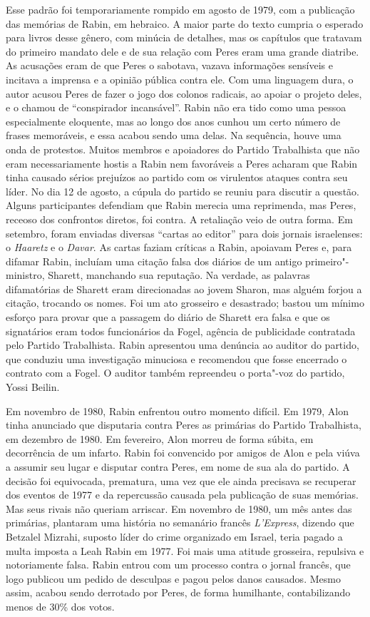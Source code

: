 Esse padrão foi temporariamente rompido em agosto de 1979, com a
publicação das memórias de Rabin, em hebraico. A maior parte do texto
cumpria o esperado para livros desse gênero, com minúcia de detalhes,
mas os capítulos que tratavam do primeiro mandato dele e de sua relação
com Peres eram uma grande diatribe. As acusações eram de que Peres o
sabotava, vazava informações sensíveis e incitava a imprensa e a opinião
pública contra ele. Com uma linguagem dura, o autor acusou Peres de
fazer o jogo dos colonos radicais, ao apoiar o projeto deles, e o chamou
de ``conspirador incansável''. Rabin não era tido como uma pessoa
especialmente eloquente, mas ao longo dos anos cunhou um certo número de
frases memoráveis, e essa acabou sendo uma delas. Na sequência, houve
uma onda de protestos. Muitos membros e apoiadores do Partido
Trabalhista que não eram necessariamente hostis a Rabin nem favoráveis a
Peres acharam que Rabin tinha causado sérios prejuízos ao partido com os
virulentos ataques contra seu líder. No dia 12 de agosto, a cúpula do
partido se reuniu para discutir a questão. Alguns participantes
defendiam que Rabin merecia uma reprimenda, mas Peres, receoso dos
confrontos diretos, foi contra. A retaliação veio de outra forma. Em
setembro, foram enviadas diversas ``cartas ao editor'' para dois jornais
israelenses: o \emph{Haaretz} e o \emph{Davar}. As cartas faziam
críticas a Rabin, apoiavam Peres e, para difamar Rabin, incluíam uma
citação falsa dos diários de um antigo primeiro"-ministro, Sharett,
manchando sua reputação. Na verdade, as palavras difamatórias de Sharett
eram direcionadas ao jovem Sharon, mas alguém forjou a citação, trocando
os nomes. Foi um ato grosseiro e desastrado; bastou um mínimo esforço
para provar que a passagem do diário de Sharett era falsa e que os
signatários eram todos funcionários da Fogel, agência de publicidade
contratada pelo Partido Trabalhista. Rabin apresentou uma denúncia ao
auditor do partido, que conduziu uma investigação minuciosa e recomendou
que fosse encerrado o contrato com a Fogel. O auditor também repreendeu
o porta"-voz do partido, Yossi Beilin.

Em novembro de 1980, Rabin enfrentou outro momento difícil. Em 1979,
Alon tinha anunciado que disputaria contra Peres as primárias do Partido
Trabalhista, em dezembro de 1980. Em fevereiro, Alon morreu de forma
súbita, em decorrência de um infarto. Rabin foi convencido por amigos de
Alon e pela viúva a assumir seu lugar e disputar contra Peres, em nome
de sua ala do partido. A decisão foi equivocada, prematura, uma vez que
ele ainda precisava se recuperar dos eventos de 1977 e da repercussão
causada pela publicação de suas memórias. Mas seus rivais não queriam
arriscar. Em novembro de 1980, um mês antes das primárias, plantaram uma
história no semanário francês \emph{L'Express}, dizendo que Betzalel
Mizrahi, suposto líder do crime organizado em Israel, teria pagado a
multa imposta a Leah Rabin em 1977. Foi mais uma atitude grosseira,
repulsiva e notoriamente falsa. Rabin entrou com um processo contra o
jornal francês, que logo publicou um pedido de desculpas e pagou pelos
danos causados. Mesmo assim, acabou sendo derrotado por Peres, de forma
humilhante, contabilizando menos de 30\% dos votos.


